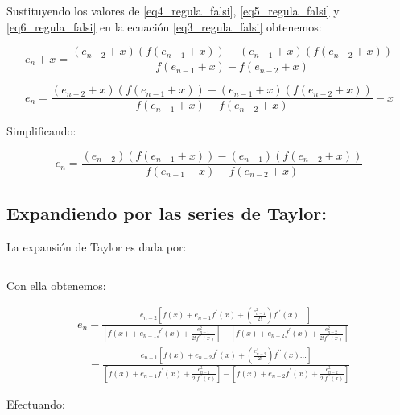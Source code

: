 Sustituyendo los valores de \eqref{eq4_regula_falsi}, \eqref{eq5_regula_falsi} y \eqref{eq6_regula_falsi} en la ecuación \eqref{eq3_regula_falsi} obtenemos:

\begin{displaymath}
    e_n + x = \frac{(e_{n-2} + x)(f(e_{n-1} + x))-(e_{n-1} + x)(f(e_{n-2} + x))}{f(e_{n-1} + x) - f(e_{n-2} + x)}
\end{displaymath}

\begin{displaymath}
    e_n = \frac{(e_{n-2} + x)(f(e_{n-1} + x))-(e_{n-1} + x)(f(e_{n-2} + x))}{f(e_{n-1} + x) - f(e_{n-2} + x)} - x
\end{displaymath}

Simplificando:

\begin{equation}
    \label{eq7_regula_falsi}
    e_n = \frac{(e_{n-2})(f(e_{n-1} + x))-(e_{n-1})(f(e_{n-2} + x))}{f(e_{n-1} + x) - f(e_{n-2} + x)}
\end{equation}

\subsection{Expandiendo por las series de Taylor:}

La expansión de Taylor es dada por:

\begin{displaymath}
    [f(a + h) = f(a) + hf^\prime(a) + \frac{h^2}{2}f^{\prime\prime}(a) + \ldots]
\end{displaymath}

Con ella obtenemos:

\begin{displaymath}
    \begin{split}
        &e_n - \frac{e_{n-2}[f(x) + e_{n-1}f^\prime (x) + (\frac{e_{n-1}^2}{2!}) f^{\prime\prime} (x) \ldots]}{[f(x) + e_{n-1}f^\prime (x) + \frac{e_{n-1}^2}{2! f^{\prime\prime} (x)}] - [f(x) + e_{n-2}f^\prime (x) + \frac{e_{n-2}^2}{2! f^{\prime\prime} (x)}]}\\
        &\quad - \frac{e_{n-1}[f(x) + e_{n-2}f^\prime (x) + (\frac{e_{n-2}^2}{2!}) f^{\prime\prime} (x) \ldots]}{[f(x) + e_{n-1}f^\prime (x) + \frac{e_{n-1}^2}{2! f^{\prime\prime} (x)}] - [f(x) + e_{n-2}f^\prime (x) + \frac{e_{n-2}^2}{2! f^{\prime\prime} (x)}]}
    \end{split}
\end{displaymath}

Efectuando:

